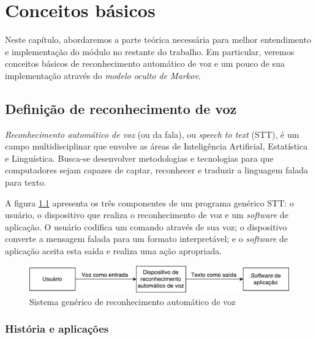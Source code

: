\chapter{Conceitos básicos}
\label{cap:structure-of-speech}

Neste capítulo, abordaremos a parte teórica necessária para melhor entendimento e implementação do módulo no restante do trabalho. Em particular, veremos conceitos básicos de reconhecimento automático de voz e um pouco de sua implementação através do \emph{modelo oculto de Markov}.


\section{Definição de reconhecimento de voz}


\textit{Reconhecimento automático de voz} (ou da fala), ou \textit{speech to text} (STT), é um campo multidisciplinar que envolve as áreas de Inteligência Artificial, Estatística e Linguística. Busca-se desenvolver metodologias e tecnologias para que computadores sejam capazes de captar, reconhecer e traduzir a linguagem falada para texto.

A figura \ref{speech_system} apresenta os três componentes de um programa genérico STT: o usuário, o dispositivo que realiza o reconhecimento de voz e um \textit{software} de aplicação. O usuário codifica um comando através de sua voz; o dispositivo converte a mensagem falada para um formato interpretável; e o \textit{software} de aplicação aceita esta saída e realiza uma ação apropriada.

\begin{figure}[H]
  \centering
  \includegraphics[width=.7\textwidth]{image/speech_system.pdf}
  \caption{Sistema genérico de reconhecimento automático de voz}
  \label{speech_system}
\end{figure}


\subsection{História e aplicações}

